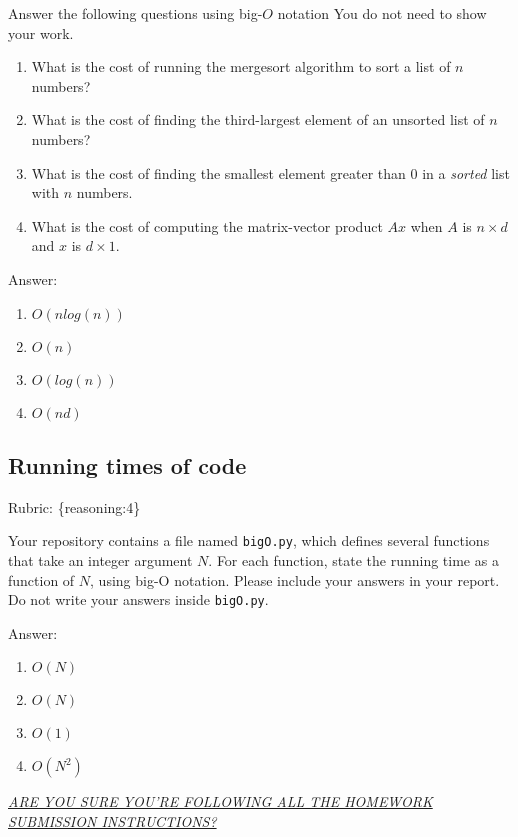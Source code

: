 \documentclass{article}
\def\rubric#1{\gre{Rubric: \{#1\}}}{}
\def\blu#1{{\color{blu}#1}}
\def\gre#1{{\color{gre}#1}}
\def\enum#1{\begin{enumerate}#1\end{enumerate}}
\begin{document}
\blu{Answer the following questions using big-$O$ notation} You do not need to show your work.
\begin{enumerate}
\item What is the cost of running the mergesort algorithm to sort  a list of $n$ numbers?
\item What is the cost of finding the third-largest element of an unsorted list of $n$ numbers?
\item What is the cost of finding the smallest element greater than 0 in a \emph{sorted} list with $n$ numbers.
\item What is the cost of computing the matrix-vector product $Ax$ when $A$ is $n \times d$ and $x$ is $d \times 1$.
\end{enumerate}
\textcolor{gre}{
Answer:
\enum{
\item $O(nlog(n))$
\item $O(n)$
\item $O(log(n))$
\item $O(nd)$
}}
\subsection{Running times of code}
\rubric{reasoning:4}

Your repository contains a file named \texttt{bigO.py}, which defines several functions
that take an integer argument $N$. For each function, \blu{state the running time as a function of $N$, using big-O notation}.
Please include your answers in your report. Do not write your answers inside \texttt{bigO.py}.
\textcolor{gre}{
Answer:
\enum{
\item $O(N)$
\item $O(N)$
\item $O(1)$
\item $O(N^2)$
}}
\vspace{50pt}
\underline{\emph{ARE YOU SURE YOU'RE FOLLOWING ALL THE HOMEWORK SUBMISSION INSTRUCTIONS?}}
\end{document}

